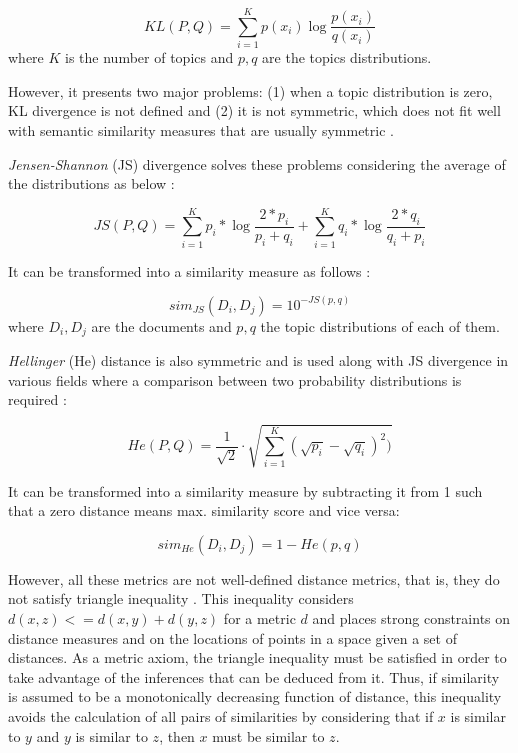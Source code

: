 \begin{equation}
KL(P,Q) = \sum\limits_{i=1}^K p(x_{i}) \log \frac{p(x_{i})}{q(x_{i})}
\label{eq:kl}
\end{equation}
where  $K$ is the number of topics and $p,q$ are the topics distributions.

However, it presents two major problems: (1) when a topic distribution is zero, KL divergence is not defined and (2) it is not symmetric, which does not fit well with semantic similarity measures that are usually symmetric \citep{Rus2013}.

\textit{Jensen-Shannon} (JS) divergence \citep{Rao1982,Lin1991} solves these problems considering the average of the distributions as below \citep{Celikyilmaz2010}:

\begin{equation}
JS(P,Q) = \sum\limits_{i=1}^K p_{i}*\log \frac{2*p_{i}}{p_{i}+q_{i}}  +  \sum\limits_{i=1}^K q_{i}*\log \frac{2*q_{i}}{q_{i}+p_{i}}
\label{eq:jsdivergence}
\end{equation}


It can be transformed into a similarity measure as follows \citep{Dagan1998} :

\begin{equation}
sim_{JS}(D_i , D_j) = 10^{- JS(p,q)}
\label{eq:simjs}
\end{equation}
where  $D_i,D_j$ are the documents and $p,q$ the topic distributions of each of them.


\textit{Hellinger} (He) distance is also symmetric and is used along with JS divergence in various fields where a comparison between two probability distributions is required \citep{Blei2007a,Hall2008,Boyd-Graber2010}:

\begin{equation}
	He(P, Q) = \frac{1}{\sqrt{2}}\cdot\sqrt{\sum\limits_{i=1}^K (\sqrt{p_i} - \sqrt{q_i})^2)}
	\label{eq:hedistance}
\end{equation}

It can be transformed into a similarity measure by subtracting it from 1 \citep{Rus2013} such that a zero distance means max. similarity score and vice versa:

\begin{equation}
	sim_{He}(D_i, D_j) = 1 - He(p,q)
	\label{eq:simhe}
\end{equation}

However, all these metrics are not well-defined distance metrics, that is, they do not satisfy triangle inequality \citep{Charikar2002}. This inequality considers $d(x, z) <= d(x, y) + d(y, z)$ for a metric $d$ \citep{Griffiths2007} and places strong constraints on distance measures and on the locations of points in a space given a set of distances. As a metric axiom, the triangle inequality must be satisfied in order to take advantage of the inferences that can be deduced from it. Thus, if similarity is assumed to be a monotonically decreasing function of distance, this inequality avoids the calculation of all pairs of similarities by considering that if $x$ is similar to $y$ and $y$ is similar to $z$, then $x$ must be similar to $z$. 

